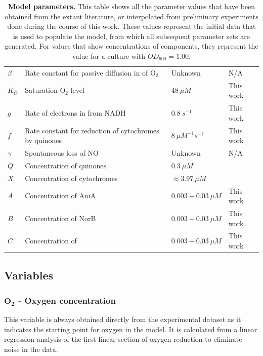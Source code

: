 \begin{table}[tbp]
\begin{center}
\begin{tabular}{>{\centering}m{1.6cm}>{\centering}m{6.1cm}>{\centering}m{2.5cm}>{\centering}m{3.1cm}}
$\beta$ & Rate constant for passive diffusion in of O$_{\textrm{2}}$ & Unknown & N/A
\tabularnewline\noalign{\smallskip}\hline\noalign{\smallskip}

$K_O$ & Saturation O$_{\textrm{2}}$ level & $48~\mu M$ & This work
\tabularnewline\noalign{\smallskip}\hline\noalign{\smallskip}

$g$ & Rate of electrons in from NADH & $0.8~s^{-1}$ & This work
\tabularnewline\noalign{\smallskip}\hline\noalign{\smallskip}

$f$ & Rate constant for reduction of cytochromes by quinones & $8~\mu M^{-1}s^{-1}$ & This work
\tabularnewline\noalign{\smallskip}\hline\noalign{\smallskip}

$\gamma$ & Spontaneous loss of NO & Unknown & N/A
\tabularnewline\noalign{\smallskip}\hline\noalign{\smallskip}

$Q$ & Concentration of quinones & $0.3~\mu M$ & \citet{Hedrick1986}
\tabularnewline\noalign{\smallskip}\hline\noalign{\smallskip}

$X$ & Concentration of cytochromes & $\approx3.97~\mu M$ & \citet{Deeudom2007}
\tabularnewline\noalign{\smallskip}\hline\noalign{\smallskip}

$A$ & Concentration of AniA & $0.003 - 0.03~\mu M$ & This work
\tabularnewline\noalign{\smallskip}\hline\noalign{\smallskip}

$B$ & Concentration of NorB & $0.003 - 0.03~\mu M$ & This work
\tabularnewline\noalign{\smallskip}\hline\noalign{\smallskip}

$C$ & Concentration of \cbbthree{} & $0.003 - 0.03~\mu M$ & This work
\tabularnewline
\bottomrule
\end{tabular}
\caption[Model parameters]{{\bf Model parameters.} This table shows all the parameter values that have been obtained from the extant literature, or interpolated from preliminary experiments done during the course of this work. These values represent the initial data that is used to populate the model, from which all subsequent parameter sets are generated. For values that show concentrations of components, they represent the value for a culture with $OD_{600}=1.00$.
\label{tab:ps}}
\end{center}
\end{table}

\subsection*{Variables}
\subsubsection*{$\mathbf{O_2}$ {\bf- Oxygen concentration}}
This variable is always obtained directly from the experimental dataset as it indicates the starting point for oxygen in the model. It is calculated from a linear regression analysis of the first linear section of oxygen reduction to eliminate noise in the data.


